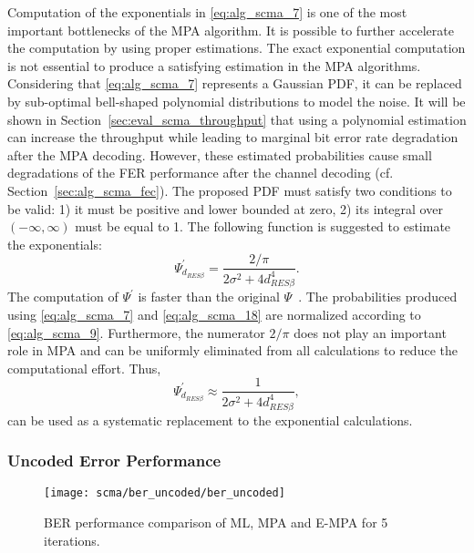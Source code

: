 Computation of the exponentials in \eqref{eq:alg_scma_7} is one of the most
important bottlenecks of the MPA algorithm. It is possible to further accelerate
the computation by using proper estimations. The exact exponential computation
is not essential to produce a satisfying estimation in the MPA algorithms.
Considering that \eqref{eq:alg_scma_7} represents a Gaussian PDF, it can be
replaced by sub-optimal bell-shaped polynomial distributions to model the noise.
It will be shown in Section~\ref{sec:eval_scma_throughput} that using a
polynomial estimation can increase the throughput while leading to marginal bit
error rate degradation after the MPA decoding. However, these estimated
probabilities cause small degradations of the FER performance after the channel
decoding (cf. Section~\ref{sec:alg_scma_fec}). The proposed PDF must satisfy two
conditions to be valid: 1) it must be positive and lower bounded at zero, 2) its
integral over $(-\infty, \infty)$ must be equal to 1. The following function is
suggested to estimate the exponentials:
\begin{equation}
  \label{eq:alg_scma_18}
  \Psi^{'}_{d_{RES \beta}} = \frac{2 / \pi}{2\sigma^2 + 4d^4_{RES \beta}}.
\end{equation}
The computation of $\Psi^{'}$ is faster than the original
$\Psi$~\cite{Ghaffari2017}. The probabilities produced using
\eqref{eq:alg_scma_7} and \eqref{eq:alg_scma_18} are normalized according to
\eqref{eq:alg_scma_9}. Furthermore, the numerator $2/\pi$ does not play an
important role in MPA and can be uniformly eliminated from all calculations to
reduce the computational effort. Thus,
\begin{equation}
  \label{eq:alg_scma_19}
  \Psi^{'}_{d_{RES \beta}} \approx \frac{1}{2\sigma^2 + 4d^4_{RES \beta}},
\end{equation}
can be used as a systematic replacement to the exponential calculations.

\subsubsection{Uncoded Error Performance}
\label{sec:alg_scma_error_rate}

\begin{figure}[htp]
  \centering
  \texttt{[image: scma/ber\_uncoded/ber\_uncoded]}
  \caption{BER performance comparison of ML, MPA and E-MPA for 5 iterations.}
  \label{plot:alg_scma_ber_uncoded_a}
\end{figure}


